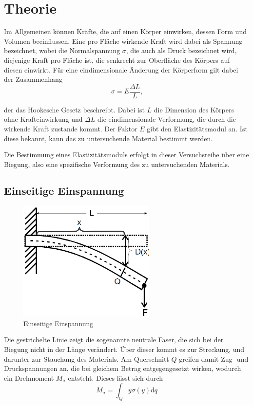 \section{Theorie}
\label{sec:Theorie}

Im Allgemeinen können Kräfte, die auf einen Körper einwirken, dessen Form und Volumen beeinflussen. 
Eine pro Fläche wirkende Kraft wird dabei als Spannung bezeichnet, wobei die Normalspannung $\sigma$, die auch als Druck bezeichnet wird,
diejenige Kraft pro Fläche ist, die senkrecht zur Oberfläche des Körpers auf diesen einwirkt. Für eine eindimensionale Änderung der
Körperform gilt dabei der Zusammenhang \begin{equation}
    \sigma = E \frac{\Delta L}L \text{,}
\end{equation}

 der das Hookesche Gesetz beschreibt. Dabei ist $L$ die Dimension des Körpers ohne Krafteinwirkung und $\Delta L$ die eindimensionale
Verformung, die durch die wirkende Kraft zustande kommt. Der Faktor $E$ gibt den Elastizitätsmodul an. Ist diese bekannt, kann das zu 
untersuchende Material bestimmt werden. 

Die Bestimmung eines Elastizitätsmoduls erfolgt in dieser Versuchsreihe über eine Biegung, also eine spezifische Verformung des zu 
untersuchenden Materials. 

\subsection{Einseitige Einspannung}

\begin{figure}
    \centering
    \includegraphics[height=6cm]{data/bild_1}
    \caption{Einseitige Einspannung}
\end{figure}

Die gestrichelte Linie zeigt die sogenannte neutrale Faser, die sich bei der Biegung nicht in der Länge verändert. 
Über dieser kommt es zur Streckung, und darunter zur Stauchung des Materials. Am Querschnitt $Q$ greifen damit Zug- und Druckspannungen
an, die bei gleichem Betrag entgegengesetzt wirken, wodurch ein Drehmoment $M_{\sigma}$ entsteht. Dieses lässt sich durch \begin{equation}
    M_{\sigma} = \int_Q y\sigma(y)\text{d}q
\end{equation}

